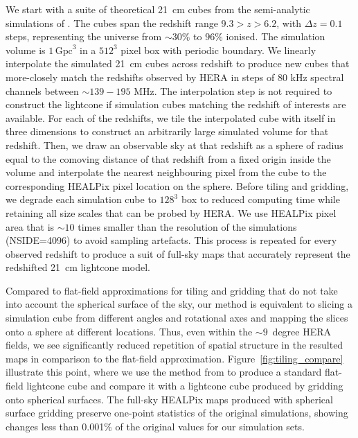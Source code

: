 \documentclass[fleqn,usenatbib]{mnras}
\begin{document}
We start with a suite of theoretical 21~cm cubes from the semi-analytic simulations of \citet{2013ApJ...767...68M}. The cubes span the redshift range $9.3>z>6.2$, with $\Delta z=0.1$ steps, representing the universe from $\sim30\%$ to $96\%$ ionised. The simulation volume is $1\,\mathrm{Gpc}^3$ in a $512^3$ pixel box with periodic boundary. We linearly interpolate the simulated 21~cm cubes across redshift to produce new cubes that more-closely match the redshifts observed by HERA in steps of 80 kHz spectral channels between $\sim139-195$ MHz. The interpolation step is not required to construct the lightcone if simulation cubes matching the redshift of interests are available. For each of the redshifts, we tile the interpolated cube with itself in three dimensions to construct an arbitrarily large simulated volume for that redshift. Then, we draw an observable sky at that redshift as a sphere of radius equal to the comoving distance of that redshift from a fixed origin inside the volume and interpolate the nearest neighbouring pixel from the cube to the corresponding HEALPix pixel location on the sphere. Before tiling and gridding, we degrade each simulation cube to $128^3$ box to reduced computing time while retaining all size scales that can be probed by HERA. We use HEALPix pixel area that is $\sim10$ times smaller than the resolution of the simulations (NSIDE=4096) to avoid sampling artefacts. This process is repeated for every observed redshift to produce a suit of full-sky maps that accurately represent the redshifted 21~cm lightcone model.

Compared to flat-field approximations for tiling and gridding that do not take into account the spherical surface of the sky, our method is equivalent to slicing a simulation cube from different angles and rotational axes and mapping the slices onto a sphere at different locations. Thus, even within the $\sim9$~degree HERA fields, we see significantly reduced repetition of spatial structure in the resulted maps in comparison to the flat-field approximation.  Figure~\ref{fig:tiling_compare} illustrate this point, where we use the method from \citet{2014MNRAS.439.1615Z} to produce a standard flat-field lightcone cube and compare it with a lightcone cube produced by gridding onto spherical surfaces.   The full-sky HEALPix maps produced with spherical surface gridding preserve one-point statistics of the original simulations, showing changes less than 0.001$\%$ of the original values for our simulation sets.
\end{document}
